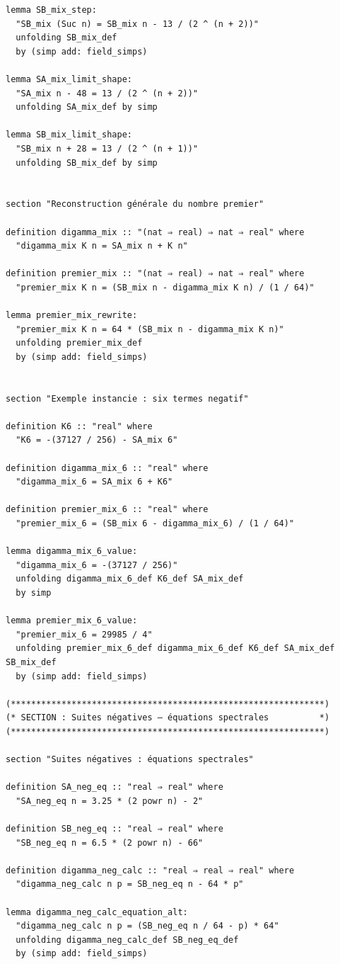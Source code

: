 \documentclass[a4paper,11pt]{article}
\begin{document}
\begin{holcode}[title={\textcolor{white}{File: methode\_spectral.thy -- Part 1/4}}]
\begin{lstlisting}
lemma SB_mix_step:
  "SB_mix (Suc n) = SB_mix n - 13 / (2 ^ (n + 2))"
  unfolding SB_mix_def
  by (simp add: field_simps)

lemma SA_mix_limit_shape:
  "SA_mix n - 48 = 13 / (2 ^ (n + 2))"
  unfolding SA_mix_def by simp

lemma SB_mix_limit_shape:
  "SB_mix n + 28 = 13 / (2 ^ (n + 1))"
  unfolding SB_mix_def by simp


section "Reconstruction générale du nombre premier"

definition digamma_mix :: "(nat ⇒ real) ⇒ nat ⇒ real" where
  "digamma_mix K n = SA_mix n + K n"

definition premier_mix :: "(nat ⇒ real) ⇒ nat ⇒ real" where
  "premier_mix K n = (SB_mix n - digamma_mix K n) / (1 / 64)"

lemma premier_mix_rewrite:
  "premier_mix K n = 64 * (SB_mix n - digamma_mix K n)"
  unfolding premier_mix_def
  by (simp add: field_simps)


section "Exemple instancie : six termes negatif"

definition K6 :: "real" where
  "K6 = -(37127 / 256) - SA_mix 6"

definition digamma_mix_6 :: "real" where
  "digamma_mix_6 = SA_mix 6 + K6"

definition premier_mix_6 :: "real" where
  "premier_mix_6 = (SB_mix 6 - digamma_mix_6) / (1 / 64)"

lemma digamma_mix_6_value:
  "digamma_mix_6 = -(37127 / 256)"
  unfolding digamma_mix_6_def K6_def SA_mix_def
  by simp

lemma premier_mix_6_value:
  "premier_mix_6 = 29985 / 4"
  unfolding premier_mix_6_def digamma_mix_6_def K6_def SA_mix_def SB_mix_def
  by (simp add: field_simps)

(**************************************************************)
(* SECTION : Suites négatives – équations spectrales          *)
(**************************************************************)

section "Suites négatives : équations spectrales"

definition SA_neg_eq :: "real ⇒ real" where
  "SA_neg_eq n = 3.25 * (2 powr n) - 2"

definition SB_neg_eq :: "real ⇒ real" where
  "SB_neg_eq n = 6.5 * (2 powr n) - 66"

definition digamma_neg_calc :: "real ⇒ real ⇒ real" where
  "digamma_neg_calc n p = SB_neg_eq n - 64 * p"

lemma digamma_neg_calc_equation_alt:
  "digamma_neg_calc n p = (SB_neg_eq n / 64 - p) * 64"
  unfolding digamma_neg_calc_def SB_neg_eq_def
  by (simp add: field_simps)



\end{lstlisting}
\end{holcode}
\end{document}
